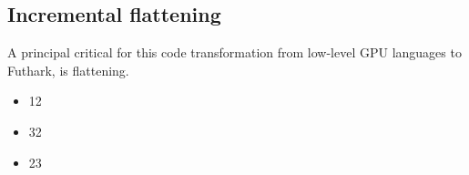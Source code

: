 \subsection{Incremental flattening}
A principal critical for this code transformation from low-level GPU languages to Futhark, is flattening. 
 
\begin{multicols}{3}
\begin{itemize}
\item 12
\item 32
\item 23
\end{itemize}
\end{multicols}
\begin{comment}
\subsection{Threshold parameters}
To choose the proper code version for the program, based on representative data, we need something to base our choices from. At runtime, Futhark generates some parameters we can use as this basis. These parameters represent a piece of codefi


\end{comment}
